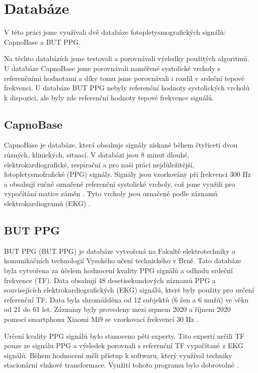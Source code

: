 \chapter{Databáze}

V této práci jsme využívali dvě databáze fotopletysmografických signálů: CapnoBase a BUT PPG.

Na těchto databázích jsme testovali a porovnávali výsledky použitých algoritmů.
U databáze CapnoBase jsme porovnávali naměřené systolické vrcholy s referenčními hodnotami a díky tomu jsme porovnávali i rozdíl v srdeční tepové frekvenci.
U databáze BUT PPG nebyly referenční hodnoty systolických vrcholů k dispozici, ale byly zde referenční hodnoty tepové frekvence signálů.

\section{CapnoBase}

CapnoBase je databáze, která obsahuje signály získané během čtyřiceti dvou různých, klinických, situací.
V databázi jsou 8 minut dlouhé, elektrokardiografické, respirační a pro naši práci nejdůležitější, fotopletysmofrafické (PPG) signály.
Signály jsou vzorkovány při frekvenci 300 Hz a obsahují ručně označené referenční systolické vrcholy, což jsme využili pro vypočítání matice záměn \cite{Karlen2013}.
Tyto vrcholy jsou označené podle záznamů elektrokardiogramů (EKG) \cite{Charlton2022}.

\section{BUT PPG}

\acl{BUT PPG} (\acs{BUT PPG}) je databáze vytvořená na Fakultě elektrotechniky a komunikačních technologií Vysokého učení technického v Brně.
Tato databáze byla vytvořena za účelem hodnocení kvality PPG signálů a odhadu srdeční frekvence (TF).
Data obsahují 48 desetisekundových záznamů PPG a souvisejících elektrokardiografických (EKG) signálů, které byly použity pro určení referenční TF.
Data byla shromážděna od 12 subjektů (6 žen a 6 mužů) ve věku od 21 do 61 let.
Záznamy byly provedeny mezi srpnem 2020 a říjnem 2020 pomocí smartphonu Xiaomi Mi9 se vzorkovací frekvencí 30 Hz \cite{Charlton2023}.

Určení kvality PPG signálů bylo stanoveno pěti experty.
Tito experti určili TF pouze ze signálu PPG a výsledek porovnali s referenční TF vypočítané z EKG signálů.
Během hodnocení měli přístup k softwaru, který využíval techniky stacionární vlnkové transformace.
Využití tohoto programu bylo dobrovolné \cite{BUT_PPG}.

